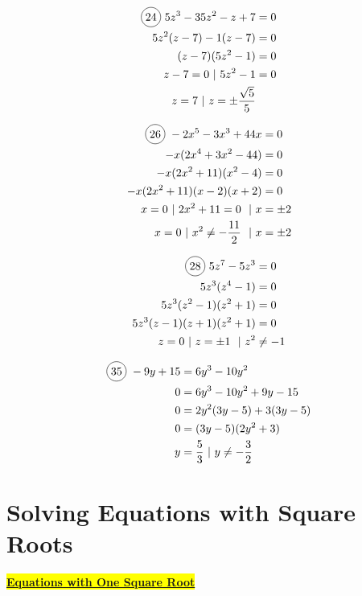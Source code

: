\begin{multicols}{2}
\begin{align*}
  \circled{24}\ 5z^{3}-35z^{2}-z+7&=0\\
  5z^{2}(z-7)-1(z-7)&=0\\
  (z-7)(5z^{2}-1)&=0\\
  z-7=0 \text{ | } 5z^{2}-1&=0\\
  z=7 \text{ | } z=\pm \frac{\sqrt{5}}{5}&\\
\end{align*}

\begin{align*}
  \circled{26}\ -2x^{5}-3x^{3}+44x&=0\\
  -x(2x^{4}+3x^{2}-44)&=0\\
  -x(2x^{2}+11)(x^{2}-4)&=0\\
  -x(2x^{2}+11)(x-2)(x+2)&=0\\
  x=0 \text{ | } 2x^{2}+11=0\ \text{ | }x&=\pm 2\\
  x=0 \text{ | } x^{2}\neq -\frac{11}{2}\ \text{ | }x&=\pm 2\\
\end{align*}

\begin{align*}
  \circled{28}\ 5z^{7}-5z^{3}&=0\\
  5z^{3}(z^{4}-1)&=0\\
  5z^{3}(z^{2}-1)(z^{2}+1)&=0\\
  5z^{3}(z-1)(z+1)(z^{2}+1)&=0\\
  z=0 \text{ | } z=\pm 1\ \text{ | }z^{2}&\neq -1\\
\end{align*}

\begin{align*}
  \circled{35}\ -9y+15&=6y^{3}-10y^{2}\\
  0&=6y^{3}-10y^{2}+9y-15\\
  0&=2y^{2}(3y-5)+3(3y-5)\\
  0&=(3y-5)(2y^{2}+3)\\
  y&=\frac{5}{3} \text{ | } y\neq -\frac{3}{2}\\
\end{align*}
\end{multicols}

\section{Solving Equations with Square Roots}

\centerline{\colorbox{yellow}{\underline{\textbf{\large Equations with One Square Root}}}}

